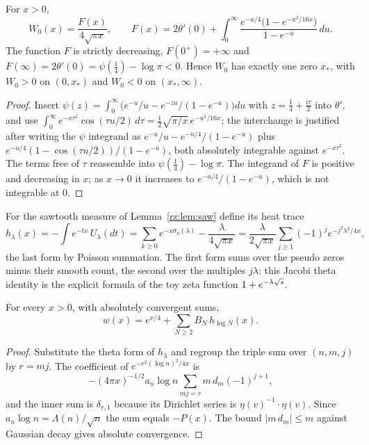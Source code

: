 \begin{lemma}\label{rz:lem:W0}
For $x>0$,
\[
W_0(x)=\frac{F(x)}{4\sqrt{\pi x}},\qquad F(x)=2\theta'(0)+\int_0^\infty\frac{e^{-u/4}\bigl(1-e^{-u^2/16x}\bigr)}{1-e^{-u}}\,du .
\]
The function $F$ is strictly decreasing, $F(0^+)=+\infty$ and $F(\infty)=2\theta'(0)=\psi(\frac14)-\log\pi<0$. Hence $W_0$ has exactly one zero $x_*$, with $W_0>0$ on $(0,x_*)$ and $W_0<0$ on $(x_*,\infty)$.
\end{lemma}

\begin{proof}
Insert $\psi(z)=\int_0^\infty\bigl(e^{-u}/u-e^{-zu}/(1-e^{-u})\bigr)du$ with $z=\frac14+\frac{i\tau}2$ into $\theta'$, and use $\int_0^\infty e^{-x\tau^2}\cos(\tau u/2)\,d\tau=\frac12\sqrt{\pi/x}\,e^{-u^2/16x}$; the interchange is justified after writing the $\psi$ integrand as $e^{-u}/u-e^{-u/4}/(1-e^{-u})$ plus $e^{-u/4}(1-\cos(\tau u/2))/(1-e^{-u})$, both absolutely integrable against $e^{-x\tau^2}$. The terms free of $\tau$ reassemble into $\psi(\frac14)-\log\pi$. The integrand of $F$ is positive and decreasing in $x$; as $x\to0$ it increases to $e^{-u/4}/(1-e^{-u})$, which is not integrable at $0$.
\end{proof}

For the sawtooth measure of Lemma~\ref{rz:lem:saw} define its heat trace
\[
h_\lambda(x)=-\int e^{-tx}\,U_\lambda(dt)=\sum_{k\ge0}e^{-x\sigma_k(\lambda)}-\frac{\lambda}{4\sqrt{\pi x}}
=\frac{\lambda}{2\sqrt{\pi x}}\sum_{j\ge1}(-1)^je^{-j^2\lambda^2/4x},
\]
the last form by Poisson summation. The first form sums over the pseudo zeros minus their smooth count, the second over the multiples $j\lambda$: this Jacobi theta identity is the explicit formula of the toy zeta function $1+e^{-\lambda\sqrt{s}}$.

\begin{proposition}\label{rz:prop:theta}
For every $x>0$, with absolutely convergent sums,
\[
w(x)=e^{x/4}+\sum_{N\ge2}B_N\,h_{\log N}(x).
\]
\end{proposition}

\begin{proof}
Substitute the theta form of $h_\lambda$ and regroup the triple sum over $(n,m,j)$ by $r=mj$. The coefficient of $e^{-r^2(\log n)^2/4x}$ is
\[
-(4\pi x)^{-1/2}a_n\log n\sum_{mj=r}m\,d_m(-1)^{j+1},
\]
and the inner sum is $\delta_{r,1}$ because its Dirichlet series is $\eta(v)^{-1}\cdot\eta(v)$. Since $a_n\log n=\Lambda(n)/\sqrt n$ the sum equals $-P(x)$. The bound $|m\,d_m|\le m$ against Gaussian decay gives absolute convergence.
\end{proof}

